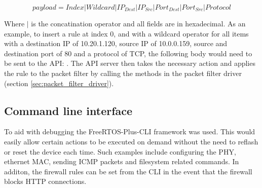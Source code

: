 \[
payload=Index | Wildcard | IP_{Dest} |  IP_{Src}  | Port_{Dest} |  Port_{Src} | Protocol
\]

Where $|$ is the concatination operator and all fields are in hexadecimal. As an example, to insert a rule at index 0, and with a wildcard operator for all items with a destination IP of 10.20.1.120, source IP of 10.0.0.159, source and destination port of 80 and a protocol of TCP, the following body would need to be sent to the API: . The API server then takes the necessary action and applies the rule to the packet filter by calling the methods in the packet filter driver (section \ref{sec:packet_filter_driver}).



\subsection{Command line interface}

To aid with debugging the FreeRTOS-Plus-CLI framework was used. This would easily allow certain actions to be executed on demand without the need to reflash or reset the device each time. Such examples include configuring the PHY, ethernet MAC, sending ICMP packets and filesystem related commands. In additon, the firewall rules can be set from the CLI in the event that the firewall blocks HTTP connections. 
